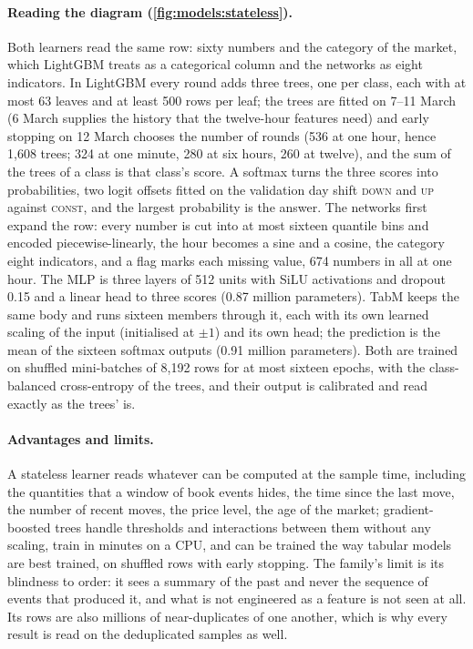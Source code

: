 \paragraph{Reading the diagram (\cref{fig:models:stateless}).}  Both learners read the same
row: sixty numbers and the category of the market, which LightGBM treats as a categorical
column and the networks as eight indicators.  In LightGBM every round adds three trees, one
per class, each with at most 63 leaves and at least 500 rows per leaf; the trees are fitted
on 7--11 March (6 March supplies the history that the twelve-hour features need) and early
stopping on 12 March chooses the number of rounds (536 at one hour, hence 1{,}608 trees; 324 at one
minute, 280 at six hours, 260 at twelve), and the sum of the trees of a class is that
class's score.  A softmax turns the three scores into probabilities, two logit offsets fitted
on the validation day shift \textsc{down} and \textsc{up} against \textsc{const}, and the
largest probability is the answer.  The networks first expand the row: every number is cut
into at most sixteen quantile bins and encoded piecewise-linearly, the hour becomes a sine
and a cosine, the category eight indicators, and a flag marks each missing value, 674
numbers in all at one hour.  The MLP is three layers of 512 units with SiLU activations and dropout 0.15 and a
linear head to three scores (0.87 million parameters).  TabM keeps the same body and runs
sixteen members through it, each with its own learned scaling of the input (initialised at
$\pm 1$) and its own head; the prediction is the mean of the sixteen softmax outputs (0.91
million parameters).  Both are trained on shuffled mini-batches of 8{,}192 rows for at most
sixteen epochs, with the class-balanced cross-entropy of the trees, and their output is
calibrated and read exactly as the trees' is.

\paragraph{Advantages and limits.}  A stateless learner reads whatever can be computed
at the sample time, including the quantities that a window of book events hides, the time
since the last move, the number of recent moves, the price level, the age of the market;
gradient-boosted trees handle thresholds and interactions between them without any
scaling, train in minutes on a CPU, and can be trained the way tabular models are best
trained, on shuffled rows with early stopping.  The family's limit is its blindness to
order: it sees a summary of the past and never the sequence of events that produced it,
and what is not engineered as a feature is not seen at all.  Its rows are also millions of
near-duplicates of one another, which is why every result is read on the deduplicated
samples as well.

